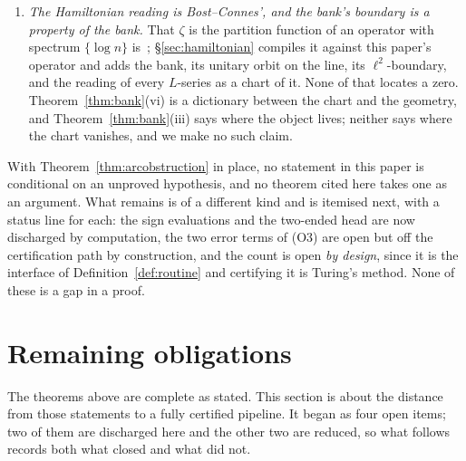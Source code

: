 \documentclass[11pt]{article}
\theoremstyle{plain}
\theoremstyle{definition}
\theoremstyle{remark}
\begin{document}
\begin{enumerate}
\item[(ix)] \emph{The Hamiltonian reading is Bost--Connes', and the bank's boundary is a
property of the bank.} That $\zeta$ is the partition function of an operator with
spectrum $\{\log n\}$ is~\cite{BostConnes1995}; \S\ref{sec:hamiltonian} compiles it
against this paper's operator and adds the bank, its unitary orbit on the line, its
$\ell^2$-boundary, and the reading of every $L$-series as a chart of it. None of that
locates a zero. Theorem~\ref{thm:bank}(vi) is a dictionary between the chart and the
geometry, and Theorem~\ref{thm:bank}(iii) says where the object lives; neither says where
the chart vanishes, and we make no such claim.
\end{enumerate}

\medskip\noindent
With Theorem~\ref{thm:arcobstruction} in place, no statement in this paper is
conditional on an unproved hypothesis, and no theorem cited here takes one as an
argument. What remains is of a different kind and is itemised next, with a status line
for each: the sign evaluations and the two-ended head are now discharged by computation,
the two error terms of (O3) are open but off the certification path by construction, and
the count is open \emph{by design}, since it is the interface of
Definition~\ref{def:routine} and certifying it is Turing's method. None of these is a
gap in a proof.

\section{Remaining obligations}\label{sec:obligations}

The theorems above are complete as stated. This section is about the distance from
those statements to a fully certified pipeline. It began as four open items; two of
them are discharged here and the other two are reduced, so what follows records both
what closed and what did not.
\end{document}

